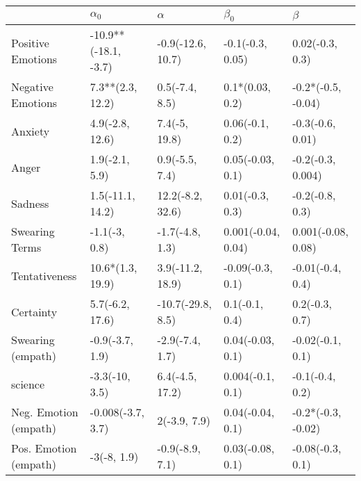 \begin{tabular}{lllll}
\toprule
{} &            $\alpha_0$ &           $\alpha$ &           $\beta_0$ &             $\beta$ \\
\midrule
Positive Emotions     &  -10.9**(-18.1, -3.7) &  -0.9(-12.6, 10.7) &    -0.1(-0.3, 0.05) &     0.02(-0.3, 0.3) \\
Negative Emotions     &      7.3**(2.3, 12.2) &     0.5(-7.4, 8.5) &     0.1*(0.03, 0.2) &  -0.2*(-0.5, -0.04) \\
Anxiety               &       4.9(-2.8, 12.6) &      7.4(-5, 19.8) &     0.06(-0.1, 0.2) &    -0.3(-0.6, 0.01) \\
Anger                 &        1.9(-2.1, 5.9) &     0.9(-5.5, 7.4) &    0.05(-0.03, 0.1) &   -0.2(-0.3, 0.004) \\
Sadness               &      1.5(-11.1, 14.2) &   12.2(-8.2, 32.6) &     0.01(-0.3, 0.3) &     -0.2(-0.8, 0.3) \\
Swearing Terms        &         -1.1(-3, 0.8) &    -1.7(-4.8, 1.3) &  0.001(-0.04, 0.04) &  0.001(-0.08, 0.08) \\
Tentativeness         &      10.6*(1.3, 19.9) &   3.9(-11.2, 18.9) &    -0.09(-0.3, 0.1) &    -0.01(-0.4, 0.4) \\
Certainty             &       5.7(-6.2, 17.6) &  -10.7(-29.8, 8.5) &      0.1(-0.1, 0.4) &      0.2(-0.3, 0.7) \\
Swearing (empath)     &       -0.9(-3.7, 1.9) &    -2.9(-7.4, 1.7) &    0.04(-0.03, 0.1) &    -0.02(-0.1, 0.1) \\
science               &        -3.3(-10, 3.5) &    6.4(-4.5, 17.2) &    0.004(-0.1, 0.1) &     -0.1(-0.4, 0.2) \\
Neg. Emotion (empath) &     -0.008(-3.7, 3.7) &       2(-3.9, 7.9) &    0.04(-0.04, 0.1) &  -0.2*(-0.3, -0.02) \\
Pos. Emotion (empath) &           -3(-8, 1.9) &    -0.9(-8.9, 7.1) &    0.03(-0.08, 0.1) &    -0.08(-0.3, 0.1) \\
\bottomrule
\end{tabular}
